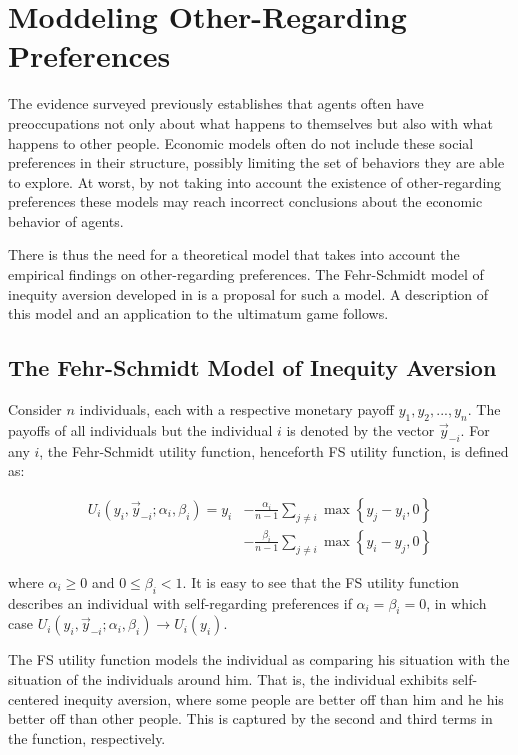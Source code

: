 \documentclass[12pt]{article}
\begin{document}
\section{Moddeling Other-Regarding Preferences}

The evidence surveyed previously establishes that agents often have preoccupations not only about what happens to themselves but also with what happens to other people. Economic models often do not include these social preferences in their structure, possibly limiting the set of behaviors they are able to explore. At worst, by not taking into account the existence of other-regarding preferences these models may reach incorrect conclusions about the economic behavior of agents.

There is thus the need for a theoretical model that takes into account the empirical findings on other-regarding preferences. The Fehr-Schmidt model of inequity aversion developed in \cite{Fehr1999} is a proposal for such a model. A description of this model and an application to the ultimatum game follows.

\subsection{The Fehr-Schmidt Model of Inequity Aversion}

Consider $n$ individuals, each with a respective monetary payoff $y_1,y_2,...,y_n$. The payoffs of all individuals but the individual $i$ is denoted by the vector $\vec{y}_{-i}$. For any $i$, the Fehr-Schmidt utility function, henceforth FS utility function, is defined as:

\begin{equation}
\begin{split}
	U_i\left(y_i,\vec{y}_{-i};\alpha_i,\beta_i\right) = y_i &- \frac{\alpha_i}{n-1} \sum_{j\neq i} \max \left \{ y_j - y_i,0 \right \}\\
	& - \frac{\beta_i}{n-1} \sum_{j\neq i} \max \left \{ y_i - y_j,0 \right \}
\end{split}
\end{equation}


\noindent
where $\alpha_i \geq 0$ and $0 \leq \beta_i <1$. It is easy to see that the FS utility function describes an individual with self-regarding preferences if $\alpha_i = \beta_i = 0$, in which case $U_i\left(y_i,\vec{y}_{-i};\alpha_i,\beta_i\right) \rightarrow U_i\left(y_i\right)$.

The FS utility function models the individual as comparing his situation with the situation of the individuals around him. That is, the individual exhibits self-centered inequity aversion, where some people are better off than him and he his better off than other people. This is captured by the second and third terms in the function, respectively.
\end{document}
